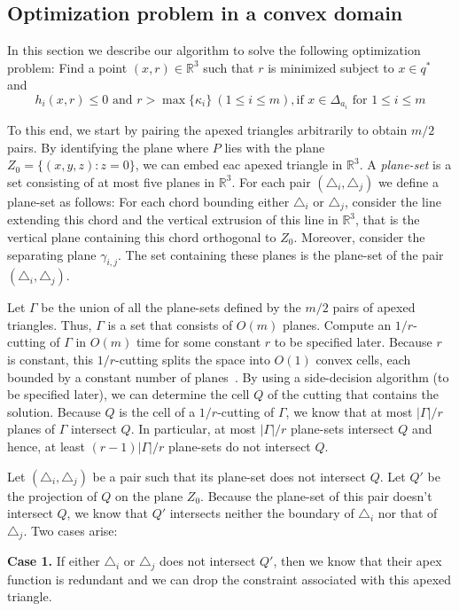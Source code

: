 \documentclass[a4paper,UKenglish]{lipics}
\begin{document}
\subsection{Optimization problem in a convex domain}
In this section we describe our algorithm to solve the following optimization problem:
Find a point $(x,r)\in \mathbb{R}^3$ such that $r$ is minimized subject to $x\in q^*$ and 
$$h_i(x, r) \leq 0 \text{ and } r > \max\{\kappa_i\}\ (1\leq i\leq m), \text{if $x\in \Delta_{a_i}$ for $1\leq i \leq m$}$$

To this end, we start by pairing the apexed triangles arbitrarily to obtain $m/2$ pairs.
By identifying the plane where $P$ lies with the plane $Z_0 = \{(x,y,z): z = 0\}$, we can embed eac apexed triangle in $\mathbb{R}^3$.
A \emph{plane-set} is a set consisting of at most five planes in $\mathbb{R}^3$.
For each pair $(\triangle_i, \triangle_j)$ we define a plane-set as follows: 
For each chord bounding either $\triangle_i$ or $\triangle_j$, consider the line extending this chord and the vertical extrusion of this line in $\mathbb{R}^3$, that is the vertical plane containing this chord orthogonal to $Z_0$. Moreover, consider the separating plane $\gamma_{i,j}$. The set containing these planes is the plane-set of the pair $(\triangle_i, \triangle_j)$.

Let $\Gamma$ be the union of all the plane-sets defined by the $m/2$ pairs of apexed triangles. Thus, $\Gamma$ is a set that consists of $O(m)$ planes. Compute an $1/r$-cutting of $\Gamma$ in $O(m)$ time for some constant $r$ to be specified later.
Because $r$ is constant, this $1/r$-cutting splits the space into $O(1)$ convex cells, each bounded by a constant number of planes~\cite{matousekCuttings}. 
By using a side-decision algorithm (to be specified later), we can determine the cell $Q$ of the cutting that contains the solution. Because $Q$ is the cell of a $1/r$-cutting of $\Gamma$, we know that at most $|\Gamma|/r$ planes of $\Gamma$ intersect $Q$. In particular, at most $|\Gamma|/r$ plane-sets intersect $Q$ and hence, at least $(r-1)|\Gamma|/r$ plane-sets do not intersect $Q$. 

Let $(\triangle_i, \triangle_j)$ be a pair such that its plane-set does not intersect $Q$. 
Let $Q'$ be the projection of $Q$ on the plane $Z_0$. Because the plane-set of this pair doesn't intersect $Q$, we know that $Q'$ intersects neither the boundary of $\triangle_i$ nor that of $\triangle_j$.
Two cases arise:

\textbf{Case 1.} If either $\triangle_i$ or $\triangle_j$ does not intersect $Q'$, then we know that their apex function is redundant and we can drop the constraint associated with this apexed triangle.
\end{document}

